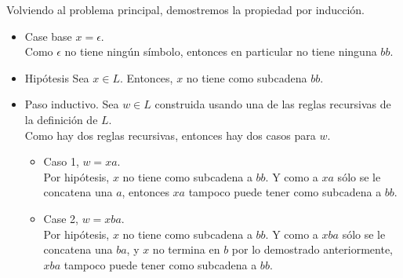 \documentclass{article}
\begin{document}
\begin{enumerate}
{\begin{enumerate}
{                    Volviendo al problema principal, demostremos la propiedad 
                    por inducción.
                    \begin{itemize}
                        \item {
                            Case base $x = \epsilon$.\\
                            Como $\epsilon$ no tiene ningún símbolo, entonces en
                            particular no tiene ninguna $bb$.
                        }
                        \item {
                            Hipótesis
                            Sea $x \in L$. Entonces, $x$ no tiene como subcadena 
                            $bb$.
                        }
                        \item {
                            Paso inductivo.
                            Sea $w \in L$ construida usando una de las reglas 
                            recursivas de la definición de $L$.\\
                            Como hay dos reglas recursivas, entonces hay dos 
                            casos para $w$.
                            \begin{itemize}
                                \item {
                                    Caso 1, $w = xa$.\\
                                    Por hipótesis, $x$ no tiene como subcadena a
                                    $bb$. Y como a $xa$ sólo se le concatena 
                                    una $a$, entonces $xa$ tampoco puede tener
                                    como subcadena a $bb$.
                                }
                                \item {
                                    Case 2, $w = xba$. \\
                                    Por hipótesis, $x$ no tiene como subcadena a
                                    $bb$. Y como a $xba$ sólo se le concatena 
                                    una $ba$, y $x$ no termina en $b$ por lo
                                    demostrado anteriormente,  $xba$ tampoco 
                                    puede tener como subcadena a $bb$.
                                }
                            \end{itemize}
                        }
                    \end{itemize}
                }
            \end{enumerate}
            
}
\end{enumerate}
\end{document}
